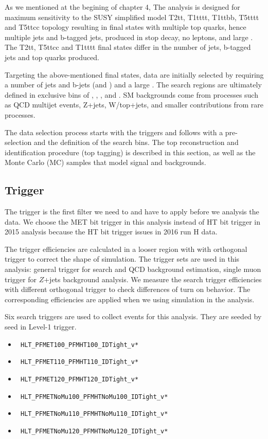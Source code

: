 As we mentioned at the begining of chapter 4, The analysis is designed for maximum sensitivity to the SUSY simplified model T2tt, T1tttt, T1ttbb, T5tttt and T5ttcc topology resulting in final states with multiple top quarks, hence multiple jets and b-tagged jets, produced in stop decay, no leptons, and large \MET. The T2tt, T5ttcc and T1tttt final states differ in the number of jets, b-tagged jets and top quarks produced. 

Targeting the above-mentioned final states, data are initially selected by requiring a number of jets and b-jets (\njets and \nbjets) and a large \MET. The search regions are ultimately defined in exclusive bins of \ntops, \nbjets, \HT, \MET and \MTTwo. SM backgrounds come from processes such as \ttbar QCD multijet events, Z+jets, W/top+jets, and smaller contributions from rare processes.

The data selection process starts with the triggers and follows with a pre-selection and the definition of the search bins. The top reconstruction and identification procedure (top tagging) is described in this section, as well as the Monte Carlo (MC) samples that model signal and backgrounds.

\subsection{Trigger}
\label{sec:trig}

The trigger is the first filter we need to and have to apply before we analysis the data. We choose the MET bit trigger in this analysis instead of HT bit trigger in 2015 analysis because the HT bit trigger issues in 2016 run H data. 

The trigger efficiencies are calculated in a looser region with with orthogonal trigger to correct the shape of simulation. The trigger sets are used in this analysis: general trigger for search and QCD background estimation, single muon trigger for $Z$+jets background analysis. We measure the search trigger efficiencies with different orthogonal trigger to check differences of turn on behavior. The corresponding efficiencies are applied when we using simulation in the analysis.

Six search triggers are used to collect events for this analysis. They are seeded by \MET seed in Level-1 trigger. 
\begin{itemize}
\item \texttt{ HLT\_PFMET100\_PFMHT100\_IDTight\_v*}
\item \texttt{ HLT\_PFMET110\_PFMHT110\_IDTight\_v*}
\item \texttt{ HLT\_PFMET120\_PFMHT120\_IDTight\_v*}
\item \texttt{ HLT\_PFMETNoMu100\_PFMHTNoMu100\_IDTight\_v*} 
\item \texttt{ HLT\_PFMETNoMu110\_PFMHTNoMu110\_IDTight\_v* }
\item \texttt{ HLT\_PFMETNoMu120\_PFMHTNoMu120\_IDTight\_v*}
\end{itemize}

